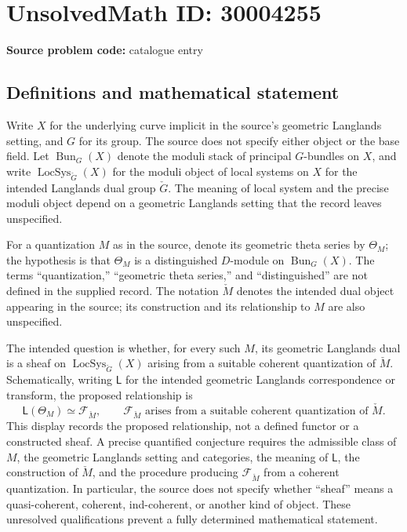 \documentclass[11pt]{article}
\begin{document}
\section*{UnsolvedMath ID: 30004255}
\textbf{Source problem code:} catalogue entry
\subsection{Definitions and mathematical statement}
Write \(X\) for the underlying curve implicit in the source's geometric Langlands setting, and \(G\) for its group. The source does not specify either object or the base field. Let \(\operatorname{Bun}_G(X)\) denote the moduli stack of principal \(G\)-bundles on \(X\), and write \(\operatorname{LocSys}_{\check G}(X)\) for the moduli object of local systems on \(X\) for the intended Langlands dual group \(\check G\). The meaning of local system and the precise moduli object depend on a geometric Langlands setting that the record leaves unspecified.

For a quantization \(M\) as in the source, denote its geometric theta series by \(\Theta_M\); the hypothesis is that \(\Theta_M\) is a distinguished \(D\)-module on \(\operatorname{Bun}_G(X)\). The terms ``quantization,'' ``geometric theta series,'' and ``distinguished'' are not defined in the supplied record. The notation \(\check M\) denotes the intended dual object appearing in the source; its construction and its relationship to \(M\) are also unspecified.

The intended question is whether, for every such \(M\), its geometric Langlands dual is a sheaf on \(\operatorname{LocSys}_{\check G}(X)\) arising from a suitable coherent quantization of \(\check M\). Schematically, writing \(\mathsf L\) for the intended geometric Langlands correspondence or transform, the proposed relationship is
\[
\mathsf L(\Theta_M)\simeq\mathcal F_{\check M},
\qquad
\mathcal F_{\check M}\text{ arises from a suitable coherent quantization of }\check M.
\]
This display records the proposed relationship, not a defined functor or a constructed sheaf. A precise quantified conjecture requires the admissible class of \(M\), the geometric Langlands setting and categories, the meaning of \(\mathsf L\), the construction of \(\check M\), and the procedure producing \(\mathcal F_{\check M}\) from a coherent quantization. In particular, the source does not specify whether ``sheaf'' means a quasi-coherent, coherent, ind-coherent, or another kind of object. These unresolved qualifications prevent a fully determined mathematical statement.
\end{document}
